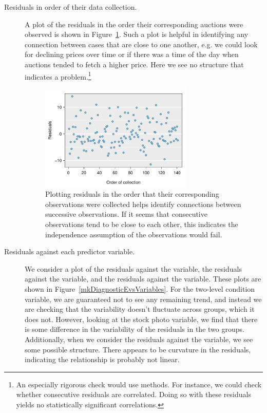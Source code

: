 \begin{description}
\item[Residuals in order of their data collection.] A plot of the residuals in the order their corresponding auctions were observed is shown in Figure~\ref{mkDiagnosticInOrder}. Such a plot is helpful in identifying any connection between cases that are close to one another, e.g. we could look for declining prices over time or if there was a time of the day when auctions tended to fetch a higher price. Here we see no structure that indicates a problem.\footnote{An especially rigorous check would use  methods. For instance, we could check whether consecutive residuals are correlated. Doing so with these residuals yields no statistically significant correlations.}

\begin{figure}[h]
\centering
\includegraphics[width=0.72\textwidth]{ch_regr_mult_and_log/figures/marioKartDiagnostics/mkDiagnosticInOrder}
\caption{Plotting residuals in the order that their corresponding observations were collected helps identify connections between successive observations. If it seems that consecutive observations tend to be close to each other, this indicates the independence assumption of the observations would fail.}
\label{mkDiagnosticInOrder}
\end{figure}

\item[Residuals against each predictor variable.] We consider a plot of the residuals against the  variable, the residuals against the  variable, and the residuals against the  variable. These plots are shown in Figure~\ref{mkDiagnosticEvsVariables}. For the two-level condition variable, we are guaranteed not to see any remaining trend, and instead we are checking that the variability doesn't fluctuate across groups, which it does not. However, looking at the stock photo variable, we find that there is some difference in the variability of the residuals in the two groups. Additionally, when we consider the residuals against the  variable, we see some possible structure. There appears to be curvature in the residuals, indicating the relationship is probably not linear.


\end{description}
